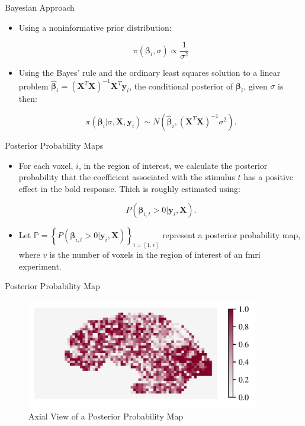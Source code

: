 \documentclass{beamer}
\begin{document}
\begin{frame}{Bayesian Approach}
\begin{itemize}
\item Using a noninformative prior distribution:

$$\pi \left( \bm{\beta}_i, \sigma \right) \propto \frac{1}{\sigma^{2}}$$

\item Using the Bayes' rule and the ordinary least squares solution to a linear problem 
$\bm{\hat{\beta}}_i = \left( \bm{X}^T\bm{X} \right)^{-1}\bm{X}^T \bm{y}_i$, the 
conditional posterior of $\bm{\beta}_i$, given $\sigma$ is then:

$$\pi \left( \bm{\beta}_i|\sigma , \bm{X}, \bm{y}_i \right) \sim N\left( \bm{\hat{\beta}}_i, \left( \bm{X}^T\bm{X} \right)^{-1} \sigma^2 \right).$$
\end{itemize}
\end{frame}

\begin{frame}{Posterior Probability Maps}
\begin{itemize}
\item For each voxel, $i$, in the region of interest, we 
calculate the posterior probability that the coefficient associated with 
the stimulus $t$ has a positive effect in the \gls{bold} response. 
Thich is roughly estimated using: 

$$P(\bm{\beta}_{i,t} > 0 | \bm{y}_i, \bm{X}).$$

\item Let 
$\bm{\mathbb{P}} = \left\{ P(\bm{\beta}_{i,t} > 0 | \bm{y}_i, \bm{X}) \right\}_{i=[1,v]}$ 
represent a posterior probability map, where $v$ is the number of voxels in 
the region of interest of an \gls{fmri} experiment.
\end{itemize}
\end{frame}

\begin{frame}{Posterior Probability Map}
\begin{figure}
\centering
\includegraphics[width=0.9\textwidth]{Images/pMapEx.png}
\caption{Axial View of a Posterior Probability Map}
\end{figure}
\end{frame}
\end{document}

